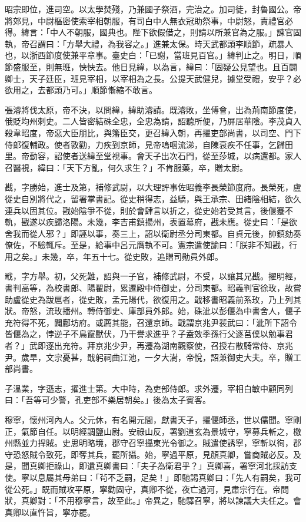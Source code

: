 \begin{pinyinscope}
 昭宗即位，進司空。以太學焚殘，乃兼國子祭酒，完治之。加司徒，封魯國公。帝將郊見，中尉樞密使索宰相朝服，有司白中人無衣冠助祭事，中尉怒，責禮官必得。緯言：「中人不朝服，國典也。陛下欲假借之，則請以所兼官為之服。」諫官固執，帝召謂曰：「方舉大禮，為我容之。」進兼太保。時天武都頭李順節，疏暴人也，以浙西節度使兼平章事。臺史白：「已謝，當班見百官。」緯判止之。明日，順節盛服至，則無班，怏怏去。他日見緯，以為言，緯曰：「固疑公見望也。且百闢卿士，天子廷臣，班見宰相，以宰相為之長。公提天武健兒，據堂受禮，安乎？必欲用之，去都頭乃可。」順節慚縮不敢言。



 張濬將伐太原，帝不決，以問緯，緯助濬請。既濬敗，坐傅會，出為荊南節度使，俄貶均州刺史。二人皆密結硃全忠，全忠為請，詔聽所便，乃屏居華陰。李茂貞入殺韋昭度，帝惡大臣朋比，與籓臣交，更召緯入朝，再擢吏部尚書，以司空、門下侍郎復輔政。使者敦勸，力疾到京師，見帝嗚咽流涕，自陳衰疾不任事，乞歸田里。帝動容，詔使者送緯至堂視事。會天子出次石門，從至莎城，以病還都。家人召醫視，緯曰：「天下方亂，何久求生？」不肯服藥，卒，贈太尉。



 戡，字勝始，進士及第，補修武尉，以大理評事佐昭義李長榮節度府。長榮死，盧從史自別將代之，留署掌書記。從史稍得志，益驕，與王承宗、田緒陰相結，欲久連兵以固其位。戡始陰爭不從，則於會肆言以折之，從史始若受其言，後偃蹇不軌，戡遂以疾歸洛陽。未幾，李吉甫鎮揚州，表置幕府，戡未應。從史曰：「是欲舍我而從人邪？」即誣以事，奏三上，詔以衛尉丞分司東都。自貞元後，帥鎮劾奏僚佐，不驗輒斥。至是，給事中呂元膺執不可。憲宗遣使諭曰：「朕非不知戡，行用之矣。」未幾，卒，年五十七。從史敗，追贈司勛員外郎。



 戢，字方舉。初，父死難，詔與一子官，補修武尉，不受，以讓其兄戡。擢明經，書判高等，為校書郎、陽翟尉，累遷殿中侍御史，分司東都。昭義判官徐玫，故嘗助盧從史為跋扈者，從史敗，孟元陽代，欲復用之。戢移書昭義前系玫，乃上列其狀。帝怒，流玫播州。轉侍御史、庫部員外郎。始，硃泚以彭偃為中書舍人，偃子充符得不死，闢鄜坊府。或薦其能，召還京師。戢謂京兆尹裴武曰：「泚所下詔令皆偃為之，悖逆子不鳥竄獸伏，乃干譽求進乎？子盍效季孫行父逐莒僕以勉事君者？」武即逐出充符。拜京兆少尹，再遷為湖南觀察使，召授右散騎常侍、京兆尹。歲旱，文宗憂甚，戢躬祠曲江池，一夕大澍，帝悅，詔兼御史大夫。卒，贈工部尚書。



 子溫業，字遜志，擢進士第。大中時，為吏部侍郎。求外遷，宰相白敏中顧同列曰：「吾等可少警，孔吏部不樂居朝矣。」後為太子賓客。



 穆寧，懷州河內人。父元休，有名開元間，獻書天子，擢偃師丞，世以儒聞。寧剛正，氣節自任。以明經調鹽山尉。安祿山反，署劉道玄為景城守，寧募兵斬之，檄州縣並力捍賊。史思明略境，郡守召寧攝東光令御之。賊遣使誘寧，寧斬以徇，郡守恐怒賊令致死，即奪其兵，罷所攝。始，寧過平原，見顏真卿，嘗商賊必反。及是，聞真卿拒祿山，即遺真卿書曰：「夫子為衛君乎？」真卿喜，署寧河北採訪支使。寧以息屬其母弟曰：「茍不乏嗣，足矣！」即馳謁真卿曰：「先人有嗣矣，我可從公死。」既而賊攻平原，寧勸固守，真卿不從，夜亡過河，見肅宗行在。帝問狀，真卿對：「不用穆寧言，故至此。」帝異之，馳驛召寧，將以諫議大夫任之。會真卿以直忤旨，寧亦罷。




\end{pinyinscope}

